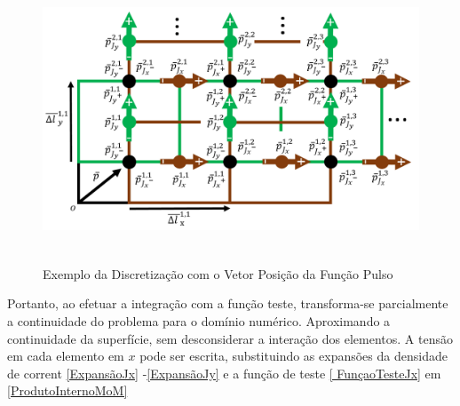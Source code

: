 \documentclass[
	12pt,				%
	openright,			%
	oneside,			%
	a4papey79r,			%
	english,			%
	brazil				%
	]{abntex2}
\begin{document}
\begin{figure}[htb]
 \label{PulsosVetorPosicaoIlustracao}
 \centering
  \begin{minipage}{\textwidth}
    \centering
    \caption{Exemplo da Discretização com o Vetor Posição da Função Pulso} \label{fig_minipage_imagem2}
    \includegraphics[width=14cm, height=8.5cm]{figures/PulsosVetorPosicaoIlustracao.png}
  \end{minipage}
  \hfill

\end{figure}
Portanto, ao efetuar  a integração com a função teste, transforma-se parcialmente a continuidade do problema para o domínio numérico. Aproximando a continuidade da superfície, sem desconsiderar a interação dos elementos. A tensão em cada elemento em $x$ pode ser escrita, substituindo as expansões da densidade de corrent \ref{ExpansãoJx} -\ref{ExpansãoJy} e a função de teste \ref{ FunçaoTesteJx} em \ref{ProdutoInternoMoM}
\end{document}
